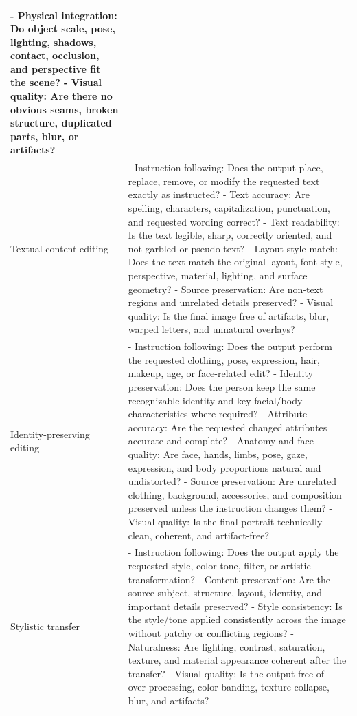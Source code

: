 \documentclass{article}
\begin{document}
\begin{table}[t]
{\begin{tabular}{p{}p{}}
- Physical integration: Do object scale, pose, lighting, shadows, contact, occlusion, and perspective fit the scene? \newline
- Visual quality: Are there no obvious seams, broken structure, duplicated parts, blur, or artifacts? \\
\midrule
Textual content editing &
- Instruction following: Does the output place, replace, remove, or modify the requested text exactly as instructed? \newline
- Text accuracy: Are spelling, characters, capitalization, punctuation, and requested wording correct? \newline
- Text readability: Is the text legible, sharp, correctly oriented, and not garbled or pseudo-text? \newline
- Layout style match: Does the text match the original layout, font style, perspective, material, lighting, and surface geometry? \newline
- Source preservation: Are non-text regions and unrelated details preserved? \newline
- Visual quality: Is the final image free of artifacts, blur, warped letters, and unnatural overlays? \\
\midrule
Identity-preserving editing &
- Instruction following: Does the output perform the requested clothing, pose, expression, hair, makeup, age, or face-related edit? \newline
- Identity preservation: Does the person keep the same recognizable identity and key facial/body characteristics where required? \newline
- Attribute accuracy: Are the requested changed attributes accurate and complete? \newline
- Anatomy and face quality: Are face, hands, limbs, pose, gaze, expression, and body proportions natural and undistorted? \newline
- Source preservation: Are unrelated clothing, background, accessories, and composition preserved unless the instruction changes them? \newline
- Visual quality: Is the final portrait technically clean, coherent, and artifact-free? \\
\midrule
Stylistic transfer &
- Instruction following: Does the output apply the requested style, color tone, filter, or artistic transformation? \newline
- Content preservation: Are the source subject, structure, layout, identity, and important details preserved? \newline
- Style consistency: Is the style/tone applied consistently across the image without patchy or conflicting regions? \newline
- Naturalness: Are lighting, contrast, saturation, texture, and material appearance coherent after the transfer? \newline
- Visual quality: Is the output free of over-processing, color banding, texture collapse, blur, and artifacts? \\
\bottomrule
\end{tabular}
}
\end{table}
\end{document}
